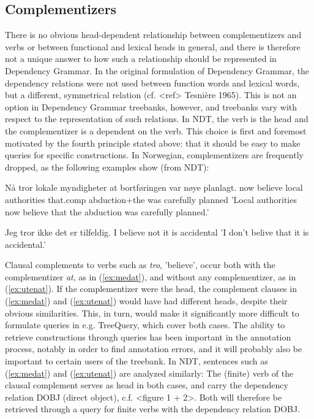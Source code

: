 \documentclass[11pt,a4paper]{article}
\begin{document}
\subsection{Complementizers}
There is no obvious head-dependent relationship between complementizers and verbs or between functional and lexical heads in general, and there is therefore not a unique answer to how such a relationship should be represented in Dependency Grammar. In the original formulation of Dependency Grammar, the dependency relations were not used between function words and lexical words, but a different, symmetrical relation (cf. <ref> Tesnière 1965). This is not an option in Dependency Grammar treebanks, however, and treebanks vary with respect to the representation of such relations. In NDT, the verb is the head and the complementizer is a dependent on the verb. This choice is first and foremost motivated by the fourth principle stated above: that it should be easy to make queries for specific constructions. In Norwegian, complementizers are frequently dropped, as the following examples show (from NDT):

\begin{examples}
\item\label{ex:medat}
\gll Nå tror lokale myndigheter at bortføringen var nøye planlagt.
now believe local authorities that.comp abduction+the was carefully planned
\glt 'Local authorities now believe that the abduction was carefully planned.'
\glend

\item\label{ex:utenat}
\gll Jeg tror ikke det er tilfeldig.
I believe not it is accidental
\glt 'I don't belive that it is accidental.'
\glend
\end{examples}
 
Clausal complements to verbs such as \emph{tro}, 'believe', occur both with the complementizer \emph{at}, as in (\ref{ex:medat}), and without any complementizer, as in (\ref{ex:utenat}). If the complementizer were the head, the complement clauses in (\ref{ex:medat}) and (\ref{ex:utenat}) would have had different heads, despite their obvious similarities. This, in turn, would make it significantly more difficult to formulate queries in e.g. TreeQuery, which cover both cases. The ability to retrieve constructions through queries has been important in the annotation process, notably in order to find annotation errors, and it will probably also be important to certain users of the treebank. In NDT, sentences such as (\ref{ex:medat}) and (\ref{ex:utenat}) are analyzed similarly: The (finite) verb of the clausal complement serves as head in both cases, and carry the dependency relation DOBJ (direct object), c.f. <figure 1 + 2>. Both will therefore be retrieved through a query for finite verbs with the dependency relation DOBJ.
\end{document}
